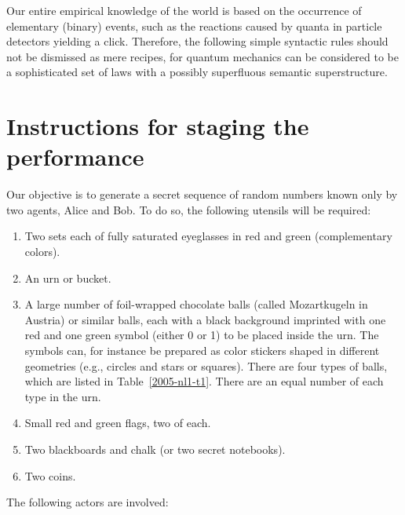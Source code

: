\documentclass[prb,amssymb,preprint]{revtex4}
\begin{document}
Our entire empirical knowledge of the world is based on the occurrence of
elementary (binary) events, such as the reactions caused by quanta in
particle detectors yielding a click. Therefore, the following simple
syntactic rules should not be dismissed as
mere recipes, for quantum mechanics can be
considered to be a
sophisticated set of laws with a possibly superfluous\cite{fuchs-peres}
semantic superstructure.

\section{Instructions for staging the performance}

Our objective is to generate a secret sequence of random numbers known only
by two agents, Alice and Bob. To do so, the following
utensils will be required:

\begin{enumerate}

\item Two sets each of fully saturated eyeglasses in red and green
(complementary colors).

\item An urn or bucket.

\item A large number of foil-wrapped chocolate balls (called
Mozartkugeln in Austria) or similar balls, each with a black background
imprinted with one red and one green symbol (either 0 or 1) to be placed
inside the urn.
The symbols can, for instance be prepared as color stickers shaped in different geometries
(e.g., circles and stars or squares).
There are four types of
balls, which are listed in Table~\ref{2005-nl1-t1}. There are an equal
number of each type in the urn.

\item Small red and green flags, two of each.

\item Two blackboards and chalk (or two secret notebooks).

\item Two coins.

\end{enumerate}

The following actors are involved:
\end{document}
